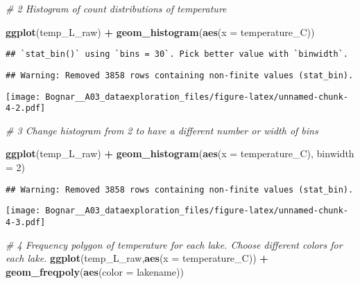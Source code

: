 \documentclass[]{article}
\newenvironment{Shaded}{\begin{snugshade}}{\end{snugshade}}
\newcommand{\KeywordTok}[1]{\textcolor[rgb]{0.13,0.29,0.53}{\textbf{#1}}}
\newcommand{\DataTypeTok}[1]{\textcolor[rgb]{0.13,0.29,0.53}{#1}}
\newcommand{\DecValTok}[1]{\textcolor[rgb]{0.00,0.00,0.81}{#1}}
\newcommand{\StringTok}[1]{\textcolor[rgb]{0.31,0.60,0.02}{#1}}
\newcommand{\CommentTok}[1]{\textcolor[rgb]{0.56,0.35,0.01}{\textit{#1}}}
\newcommand{\OperatorTok}[1]{\textcolor[rgb]{0.81,0.36,0.00}{\textbf{#1}}}
\newcommand{\NormalTok}[1]{#1}
\begin{document}
\begin{Shaded}
\begin{Highlighting}[]
\CommentTok{# 2 Histogram of count distributions of temperature}

\KeywordTok{ggplot}\NormalTok{(temp_L_raw) }\OperatorTok{+}
\StringTok{  }\KeywordTok{geom_histogram}\NormalTok{(}\KeywordTok{aes}\NormalTok{(}\DataTypeTok{x =}\NormalTok{ temperature_C))}
\end{Highlighting}
\end{Shaded}

\begin{verbatim}
## `stat_bin()` using `bins = 30`. Pick better value with `binwidth`.
\end{verbatim}

\begin{verbatim}
## Warning: Removed 3858 rows containing non-finite values (stat_bin).
\end{verbatim}

\texttt{[image: Bognar\_\_A03\_dataexploration\_files/figure-latex/unnamed-chunk-4-2.pdf]}

\begin{Shaded}
\begin{Highlighting}[]
\CommentTok{# 3 Change histogram from 2 to have a different number or width of bins}

\KeywordTok{ggplot}\NormalTok{(temp_L_raw) }\OperatorTok{+}
\StringTok{  }\KeywordTok{geom_histogram}\NormalTok{(}\KeywordTok{aes}\NormalTok{(}\DataTypeTok{x =}\NormalTok{ temperature_C), }\DataTypeTok{binwidth =} \DecValTok{2}\NormalTok{)}
\end{Highlighting}
\end{Shaded}

\begin{verbatim}
## Warning: Removed 3858 rows containing non-finite values (stat_bin).
\end{verbatim}

\texttt{[image: Bognar\_\_A03\_dataexploration\_files/figure-latex/unnamed-chunk-4-3.pdf]}

\begin{Shaded}
\begin{Highlighting}[]
\CommentTok{# 4 Frequency polygon of temperature for each lake. Choose different colors for each lake.}
\KeywordTok{ggplot}\NormalTok{(temp_L_raw,}\KeywordTok{aes}\NormalTok{(}\DataTypeTok{x =}\NormalTok{ temperature_C)) }\OperatorTok{+}
\StringTok{  }\KeywordTok{geom_freqpoly}\NormalTok{(}\KeywordTok{aes}\NormalTok{(}\DataTypeTok{color =}\NormalTok{ lakename))}
\end{Highlighting}
\end{Shaded}
\end{document}
